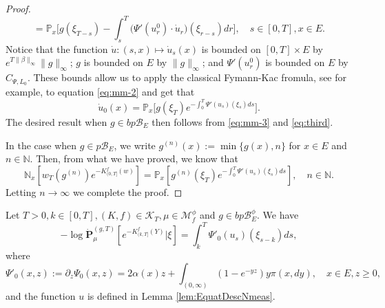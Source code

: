 \begin{proof}
\begin{equation}
	= \mathbb P_x\Big[ g(\xi_{T-s})- \int_s^T \big(\Psi'(u_r^0)\cdot \dot u_r\big)(\xi_{r-s}) dr \Big],
	\quad s\in [0,T], x\in E.
\end{equation}
	Notice that the function $\dot u:(s,x) \mapsto \dot u_s(x)$ is bounded on $[0,T] \times E$ by $e^{T \|\beta\|_\infty} \|g\|_\infty$;
	$g$ is bounded on $E$ by $\|g\|_\infty$;
	and $\Psi'(u_r^0)$ is bounded on $E$ by $C_{\Psi,L_0}$.
	These bounds allow us to apply the classical Fymann-Kac fromula, see \cite[Lemma A.1.5]{Dynkin1993Superprocesses} for example, to equation \eqref{eq:mm-2} and get that
\begin{equation}\label{eq:third}
	\dot u_0(x)
	= \mathbb P_{x} \Big[g(\xi_T) e^{-\int_0^T \Psi'(u_s)(\xi_s) ds}\Big].
\end{equation}
	The desired result when $g \in bp\mathscr B_E$ then follows from \eqref{eq:mm-3} and \eqref{eq:third}.
\par
	In the case when $g \in p\mathscr B_E$, we write $g^{(n)}(x) := \min\{g(x), n\}$ for $x \in E$ and $n \in \mathbb N$.
	Then, from what we have proved, we know that
\[
	\mathbb N_x[w_T(g^{(n)}) e^{- K_{(0,T]}^f(w)}]
	= \mathbb P_x[g^{(n)}(\xi_T) e^{-\int_0^T \Psi'(u_s)(\xi_s)ds}],
	\quad n \in \mathbb N.
\]
	Letting $n \to \infty$ we complete the proof.
\end{proof}
\begin{lem}\label{lem:spinImigrCondSpin}
	Let $T>0, k\in[0, T], (K,f) \in \mathcal K_T, \mu\in \mathcal M^\phi_f$ and $g\in bp\mathscr B^\phi_E$.
	We have
\begin{equation}\label{eq:spinImigrCondSpin}
    -\log \dot{\mathbf P}^{(g,T)}_\mu[e^{-K^f_{(k, T]}(Y)}|\xi]
	=\int_k^T \Psi'_0(u_s)(\xi_{s-k}) ds,
\end{equation}
	where
\[
	\Psi'_0(x,z)
	:= \partial_z\Psi_0(x,z)
	= 2 \alpha(x) z + \int_{(0,\infty)}(1 - e^{-yz})y \pi(x,dy),
	\quad x\in E, z\geq 0,
\]
	and the function $u$ is defined in Lemma \ref{lem:EquatDescNmeas}.
\end{lem}
